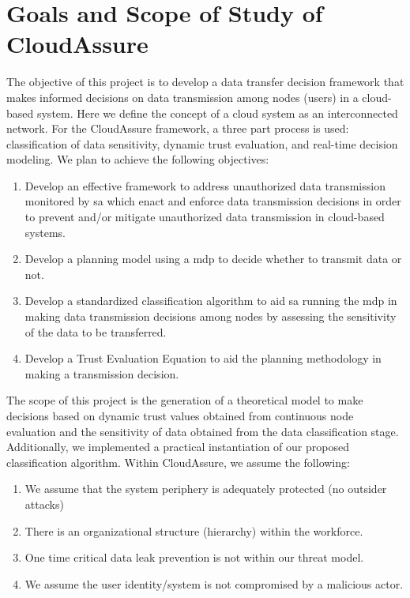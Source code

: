 \section{Goals and Scope of Study of CloudAssure}
The objective of this project is to develop a data transfer decision framework
that makes informed decisions on data transmission among nodes (users) in
a cloud-based system. Here we define the concept of a cloud system as an interconnected network.
For the CloudAssure framework, a three part process is used: classification of data sensitivity,
dynamic trust evaluation, and real-time decision modeling. We plan to achieve
the following objectives:
\begin{enumerate}
    \item Develop an effective framework to address unauthorized
        data transmission monitored by \Gls{sa} which enact and enforce data
        transmission decisions in order to prevent and/or mitigate unauthorized data
        transmission in cloud-based systems.
    \item Develop a planning model using a \gls{mdp} to decide whether to transmit data or not.
    \item Develop a standardized classification algorithm to aid \Gls{sa} running the \gls{mdp} in making data transmission decisions among nodes
        by assessing the sensitivity of the data to be transferred.  
    \item Develop a Trust Evaluation Equation to aid the planning methodology in making a transmission decision.  
\end{enumerate}
The scope of this
project is the generation of a theoretical model to make decisions based
on dynamic trust values obtained from continuous node evaluation and the
sensitivity of data obtained from the data classification stage. Additionally,
we implemented a practical instantiation of our proposed
classification algorithm. Within CloudAssure, we assume the following:

\begin{enumerate}
    \item We assume that the system periphery is adequately protected (no outsider attacks)
    \item There is an organizational structure (hierarchy) within the workforce.
    \item One time critical data leak prevention is not within our threat model.
    \item We assume the user identity/system is not compromised by a malicious actor.
\end{enumerate}

